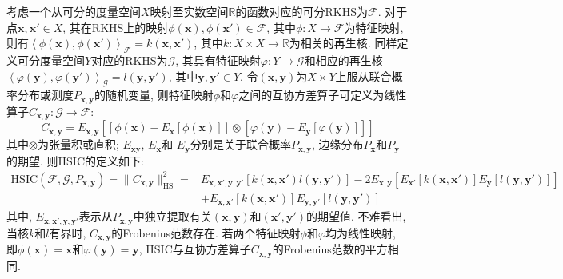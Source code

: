 \documentclass[lang=cn,10pt]{gorgeousnbook}
\numberwithin{equation}{section}%
\numberwithin{figure}{section}%
\begin{document}
考虑一个从可分的度量空间$X$映射至实数空间$\mathbb{R}$的函数对应的可分RKHS为$\mathcal{F}$. 对于点$\boldsymbol{x},\boldsymbol{x'}\in X$, 其在RKHS上的映射$\phi \left( \boldsymbol{x} \right) ,\phi \left( \boldsymbol{x'} \right) \in \mathcal{F}$, 其中$\phi :X\rightarrow \mathcal{F}$为特征映射, 则有$\left< \phi \left( \boldsymbol{x} \right) ,\phi \left( \boldsymbol{x'} \right) \right> _{\mathcal{F}}=k\left( \boldsymbol{x},\boldsymbol{x'} \right) $, 其中$k: X\times X\rightarrow \mathbb{R}$为相关的再生核. 同样定义可分度量空间$Y$对应的RKHS为$\mathcal{G}$, 其具有特征映射$\varphi :Y\rightarrow \mathcal{G}$和相应的再生核$\left< \varphi \left(\boldsymbol{y} \right) ,\varphi \left( \boldsymbol{y'}\right) \right> _{\mathcal{G}}=l\left( \boldsymbol{y},\boldsymbol{y'} \right) $, 其中$\boldsymbol{y},\boldsymbol{y'}\in Y$. 令$\left( \boldsymbol{x,y} \right) $为$X\times Y$上服从联合概率分布或测度$P_{\boldsymbol{x,y}}$的随机变量, 则特征映射$\phi$和$\varphi $之间的互协方差算子可定义为线性算子$C_{\boldsymbol{x},\boldsymbol{y}}:\mathcal{G}\rightarrow \mathcal{F}$: 
\begin{equation}
C_{\boldsymbol{x},\boldsymbol{y}}=E_{\boldsymbol{x},\boldsymbol{y}}\left[ \left[ \phi \left( \boldsymbol{x} \right) -E_{\boldsymbol{x}}\left[ \phi \left( \boldsymbol{x} \right) \right] \right] \otimes \left[ \varphi \left( \boldsymbol{y} \right) -E_{\boldsymbol{y}}\left[ \varphi \left( \boldsymbol{y} \right) \right] \right] \right] 
\end{equation}
其中$\otimes $为张量积或直积; $E_{\boldsymbol{xy}}$,  $E_{\boldsymbol{x}}$和 $E_{\boldsymbol{y}}$分别是关于联合概率$P_{\boldsymbol{x,y}}$, 边缘分布$P_{\boldsymbol{x}}$和$P_{\boldsymbol{y}}$的期望. 则HSIC的定义如下:
\begin{equation}
\begin{aligned}
\text{HSIC}\left( \mathcal{F},\mathcal{G},P_{\boldsymbol{x,y}} \right)  = \lVert C_{\boldsymbol{x,y}} \rVert _{\text{HS}}^{2} = &E_{\boldsymbol{x,x',y,y'}}\left[ k\left( \boldsymbol{x,x'} \right) l\left( \boldsymbol{y,y'} \right) \right] -2E_{\boldsymbol{x,y}}\left[ E_{\boldsymbol{x'}}\left[ k\left( \boldsymbol{x,x'} \right) \right] E_{\boldsymbol{y}}\left[ l\left( \boldsymbol{y,y'} \right) \right] \right] \\
&+E_{\boldsymbol{x,x'}}\left[ k\left( \boldsymbol{x,x'} \right) \right] E_{\boldsymbol{y,y'}}\left[ l\left( \boldsymbol{y,y'} \right) \right] 
\end{aligned}
\end{equation}
其中, $E_{\boldsymbol{x,x',y,y'}}$表示从$P_{\boldsymbol{x,y}}$中独立提取有关$\left( \boldsymbol{x,y} \right)$和$\left( \boldsymbol{x',y'} \right) $的期望值. 不难看出, 当核$k$和$l$有界时,  $C_{\boldsymbol{x,y}}$的Frobenius范数存在. 若两个特征映射$\phi$和$\varphi$均为线性映射, 即$\phi \left( \boldsymbol{x} \right) =\boldsymbol{x}$和$\varphi \left( \boldsymbol{y} \right) =\boldsymbol{y}$, HSIC与互协方差算子$C_{\boldsymbol{x,y}}$的Frobenius范数的平方相同. 
\end{document}
